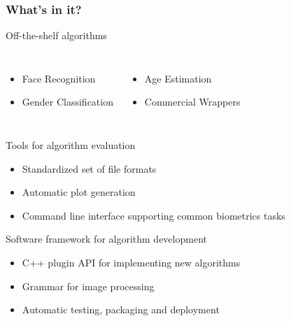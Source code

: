 \documentclass[12pt]{beamer}
\begin{document}
\begin{frame}
\frametitle{What's in it?}
\begin{block}{Off-the-shelf algorithms}
  \vspace{-6pt}
  \begin{columns}
    \begin{itemize}
    \item Face Recognition
    \item Gender Classification
    \end{itemize}
    \begin{itemize}
    \item Age Estimation
    \item Commercial Wrappers
    \end{itemize}
  \end{columns}
\end{block}
\pause
\begin{block}{Tools for algorithm evaluation}
  \begin{itemize}
  \item Standardized set of file formats
  \item Automatic plot generation
  \item Command line interface supporting common biometrics tasks
  \end{itemize}
\end{block}
\pause
\begin{block}{Software framework for algorithm development}
  \begin{itemize}
  \item C++ plugin API for implementing new algorithms
  \item Grammar for image processing
  \item Automatic testing, packaging and deployment
  \end{itemize}
\end{block}
\end{frame}

\newcommand{\graphicblock}[3]
{
  \begin{block}{#1}
    \begin{columns}
      \column{0.1\textwidth}
        \texttt{[image: \#2]}
      \column{0.9\textwidth}
        #3
    \end{columns}
  \end{block}
}
\end{document}
